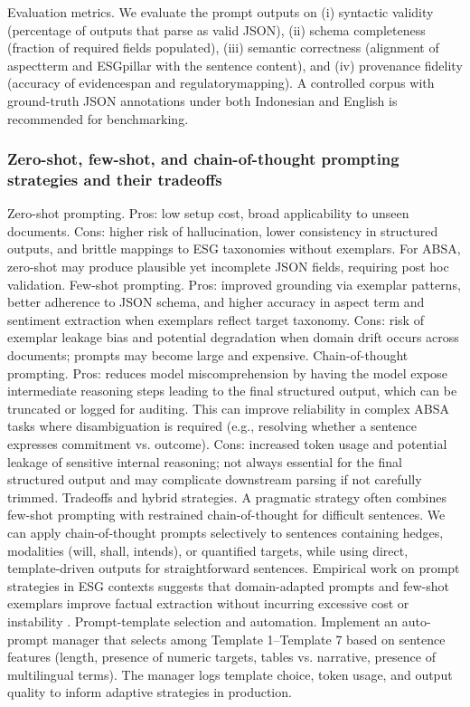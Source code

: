 Evaluation metrics. We evaluate the prompt outputs on (i) syntactic validity (percentage of outputs that parse as valid JSON), (ii) schema completeness (fraction of required fields populated), (iii) semantic correctness (alignment of aspectterm and ESGpillar with the sentence content), and (iv) provenance fidelity (accuracy of evidencespan and regulatorymapping). A controlled corpus with ground-truth JSON annotations under both Indonesian and English is recommended for benchmarking.

\subsubsection{Zero-shot, few-shot, and chain-of-thought prompting strategies and their tradeoffs}

Zero-shot prompting. Pros: low setup cost, broad applicability to unseen documents. Cons: higher risk of hallucination, lower consistency in structured outputs, and brittle mappings to ESG taxonomies without exemplars. For ABSA, zero-shot may produce plausible yet incomplete JSON fields, requiring post hoc validation.
Few-shot prompting. Pros: improved grounding via exemplar patterns, better adherence to JSON schema, and higher accuracy in aspect term and sentiment extraction when exemplars reflect target taxonomy. Cons: risk of exemplar leakage bias and potential degradation when domain drift occurs across documents; prompts may become large and expensive.
Chain-of-thought prompting. Pros: reduces model miscomprehension by having the model expose intermediate reasoning steps leading to the final structured output, which can be truncated or logged for auditing. This can improve reliability in complex ABSA tasks where disambiguation is required (e.g., resolving whether a sentence expresses commitment vs. outcome). Cons: increased token usage and potential leakage of sensitive internal reasoning; not always essential for the final structured output and may complicate downstream parsing if not carefully trimmed.
Tradeoffs and hybrid strategies. A pragmatic strategy often combines few-shot prompting with restrained chain-of-thought for difficult sentences. We can apply chain-of-thought prompts selectively to sentences containing hedges, modalities (will, shall, intends), or quantified targets, while using direct, template-driven outputs for straightforward sentences. Empirical work on prompt strategies in ESG contexts suggests that domain-adapted prompts and few-shot exemplars improve factual extraction without incurring excessive cost or instability \cite{10.4018/ijswis.385572,10.21203/rs.3.rs-6795706/v1,10.48550/arxiv.2511.14930,10.48550/arxiv.2511.01550}.
Prompt-template selection and automation. Implement an auto-prompt manager that selects among Template 1–Template 7 based on sentence features (length, presence of numeric targets, tables vs. narrative, presence of multilingual terms). The manager logs template choice, token usage, and output quality to inform adaptive strategies in production.
